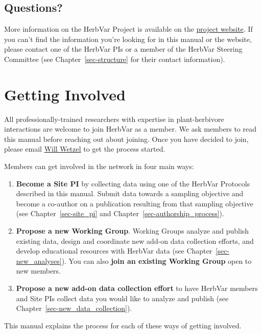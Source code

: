 \documentclass[
  letterpaper,
  oneside,
  open=any]{scrbook}
\begin{document}
\section{Questions?}\label{questions}

More information on the HerbVar Project is available on the
\href{https://herbvar.org/}{project website}. If you can't find the
information you're looking for in this manual or the website, please
contact one of the HerbVar PIs or a member of the HerbVar Steering
Committee (see Chapter~\ref{sec-structure} for their contact
information).

\chapter{Getting Involved}\label{sec-getting_involved}

All professionally-trained researchers with expertise in plant-herbivore
interactions are welcome to join HerbVar as a member. We ask members to
read this manual before reaching out about joining. Once you have
decided to join, please email
\href{mailto:william.wetzel@montana.edu}{Will Wetzel} to get the process
started.

Members can get involved in the network in four main ways:

\begin{enumerate}
\def\labelenumi{\arabic{enumi}.}
\item
  \textbf{Become a Site PI} by collecting data using one of the HerbVar
  Protocols described in this manual. Submit data towards a sampling
  objective and become a co-author on a publication resulting from that
  sampling objective (see Chapter~\ref{sec-site_pi} and
  Chapter~\ref{sec-authorship_process}).
\item
  \textbf{Propose a new Working Group}. Working Groups analyze and
  publish existing data, design and coordinate new add-on data
  collection efforts, and develop educational resources with HerbVar
  data (see Chapter~\ref{sec-new_analyses}). You can also \textbf{join
  an existing Working Group} open to new members.
\item
  \textbf{Propose a new add-on data collection effort} to have HerbVar
  members and Site PIs collect data you would like to analyze and
  publish (see Chapter~\ref{sec-new_data_collection}).
\end{enumerate}

This manual explains the process for each of these ways of getting
involved.
\end{document}

